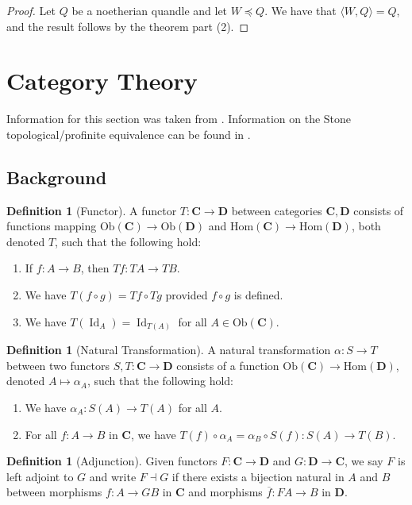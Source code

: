 \documentclass[reqno,dvipsnames]{amsart}
\let\bg\boldsymbol
\newcommand{\ol}{\overline}
\newcommand{\la}{\langle}
\newcommand{\ra}{\rangle}
\renewcommand{\a}{\alpha}
\DeclareMathOperator*{\Id}{Id}                       %
\newcommand{\Ob}{\text{Ob}}
\newcommand{\Hom}{\text{Hom}}
\theoremstyle{definition}
\newtheorem{definition}[theorem]{Definition}
\begin{document}
{\begin{proof}
Let $Q$ be a noetherian quandle and let $W\preceq Q$. We have that $\la W,Q\ra=Q$, and the result follows by the theorem part (2).
\end{proof}

\newpage

\section{Category Theory}

Information for this section was taken from \cite{johnstone1982stone}. Information on the Stone topological/profinite equivalence can be found in \cite[Section VI.2]{johnstone1982stone}.

\subsection{Background}

\begin{definition}[Functor]
A functor $T:\bg{C}\to\bg{D}$ between categories $\bg{C},\bg{D}$ consists of functions mapping $\Ob(\bg{C})\to\Ob(\bg{D})$ and $\Hom(\bg{C})\to\Hom(\bg{D})$, both denoted $T$, such that the following hold:
\begin{enumerate}[label=(\roman*)]
    \item If $f:A\to B$, then $Tf:TA\to TB$.
    \item We have $T(f\circ g)=Tf\circ Tg$ provided $f\circ g$ is defined.
    \item We have $T(\Id_A)=\Id_{T(A)}$ for all $A\in\Ob(\bg{C})$.
\end{enumerate}
\end{definition}

\begin{definition}[Natural Transformation]
A natural transformation $\a:S\to T$ between two functors $S,T:\bg{C}\to\bg{D}$ consists of a function $\Ob(\bg{C})\to\Hom(\bg{D})$, denoted $A\mapsto\a_A$, such that the following hold:
\begin{enumerate}[label=(\roman*)]
    \item We have $\a_A:S(A)\to T(A)$ for all $A$.
    \item For all $f:A\to B$ in $\bg{C}$, we have $T(f)\circ\a_A=\a_B\circ S(f):S(A)\to T(B)$.
\end{enumerate}
\end{definition}

\begin{definition}[Adjunction]
Given functors $F:\bg{C}\to\bg{D}$ and $G:\bg{D}\to\bg{C}$, we say $F$ is left adjoint to $G$ and write $F\dashv G$ if there exists a bijection natural in $A$ and $B$ between morphisms $f:A\to GB$ in $\bg{C}$ and morphisms $\ol{f}:FA\to B$ in $\bg{D}$.
\end{definition}

}
\end{document}
